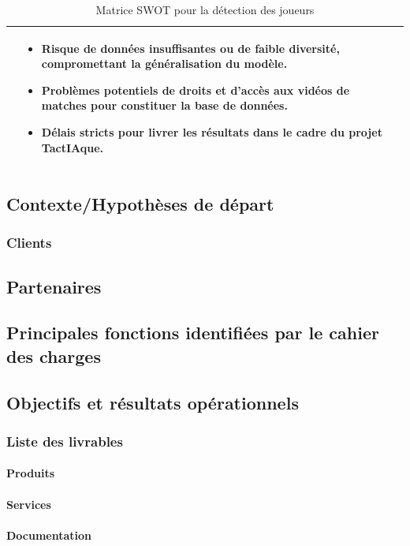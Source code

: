 \begin{table} [!h]
\begin{tabular}{|p{7cm}|p{7cm}|}
\begin{itemize}
        \end{itemize}&
        \begin{itemize}
            \item Risque de données insuffisantes ou de faible diversité, compromettant la généralisation du modèle. 
            \item Problèmes potentiels de droits et d’accès aux vidéos de matches pour constituer la base de données. 
            \item Délais stricts pour livrer les résultats dans le cadre du projet TactIAque. 
        \end{itemize}\\
        \hline  
        \end{tabular}  
        \caption{Matrice SWOT pour la détection des joueurs}  
        \label{tab:swot}
    \end{table} 

\subsection{Contexte/Hypothèses de départ}
\subsubsection{Clients}
\subsection{Partenaires}
\subsection{Principales fonctions identifiées par le cahier des charges}
\subsection{Objectifs et résultats opérationnels}
\subsubsection{Liste des livrables}
\paragraph{Produits}
\paragraph{Services}
\paragraph{Documentation}
